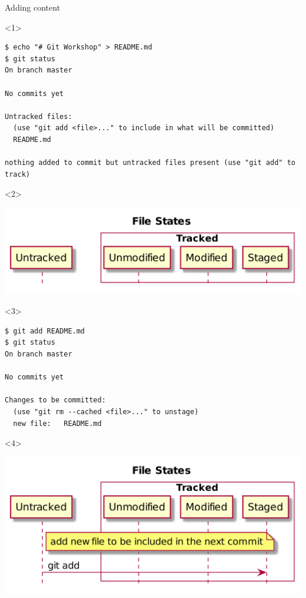 \documentclass[presentation,aspectratio=169,smaller]{beamer}
\begin{document}
\begin{frame}[label={sec:org2912395},fragile]{Adding content}
 \begin{onlyenv}<1>
\begin{verbatim}
$ echo "# Git Workshop" > README.md
$ git status
On branch master

No commits yet

Untracked files:
  (use "git add <file>..." to include in what will be committed)
  README.md

nothing added to commit but untracked files present (use "git add" to track)
\end{verbatim}
\end{onlyenv}


\begin{onlyenv}<2>
\begin{center}
\includegraphics[width=.9\linewidth]{images/git-add-0.png}
\end{center}
\end{onlyenv}

\begin{onlyenv}<3>
\begin{verbatim}
$ git add README.md
$ git status
On branch master

No commits yet

Changes to be committed:
  (use "git rm --cached <file>..." to unstage)
  new file:   README.md
\end{verbatim}
\end{onlyenv}

\begin{onlyenv}<4>
\begin{center}
\includegraphics[width=.9\linewidth]{images/git-add-1.png}
\end{center}
\end{onlyenv}


\end{frame}
\end{document}
